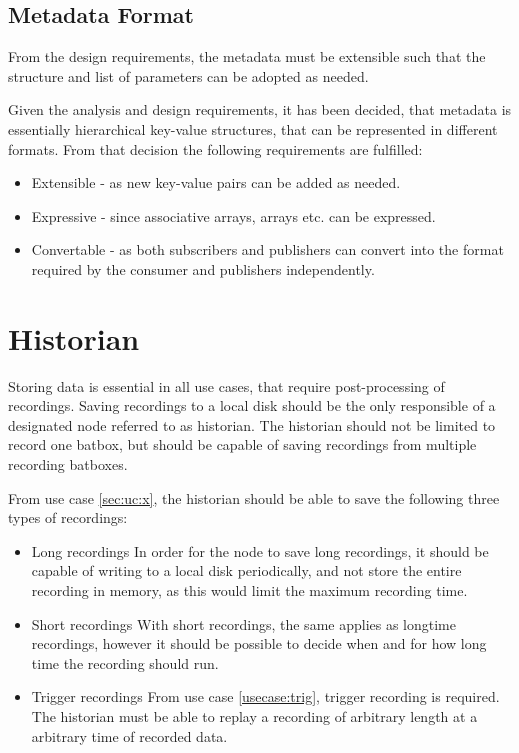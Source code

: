 \subsection{Metadata Format}
From the design requirements, the metadata must be extensible such that the structure and list of parameters can be adopted as needed.

Given the analysis and design requirements, it has been decided, that metadata is essentially hierarchical key-value structures, that can be represented in different formats. From that decision the following requirements are fulfilled:
\begin{itemize}
	\item Extensible - as new key-value pairs can be added as needed.
	\item Expressive - since associative arrays, arrays etc. can be expressed.
	\item Convertable - as both subscribers and publishers can convert into the format required by the consumer and publishers independently.
\end{itemize}

\section{Historian}

Storing data is essential in all use cases, that require post-processing of recordings. Saving recordings to a local disk should be the only responsible of a designated node referred to as historian.
The historian should not be limited to record one batbox, but should be capable of saving recordings from multiple recording batboxes.

From use case \ref{sec:uc:x}, the historian should be able to save the following three types of recordings:
\begin{itemize}
	\item Long recordings
		In order for the node to save long recordings, it should be capable of writing to a local disk periodically, and not store the entire recording in memory, as this would limit the maximum recording time.

	\item Short recordings
		With short recordings, the same applies as longtime recordings, however it should be possible to decide when and for how long time the recording should run.
	\item Trigger recordings
		From use case \ref{usecase:trig}, trigger recording is required. The historian must be able to replay a recording of arbitrary length at a arbitrary time of recorded data.
\end{itemize}

